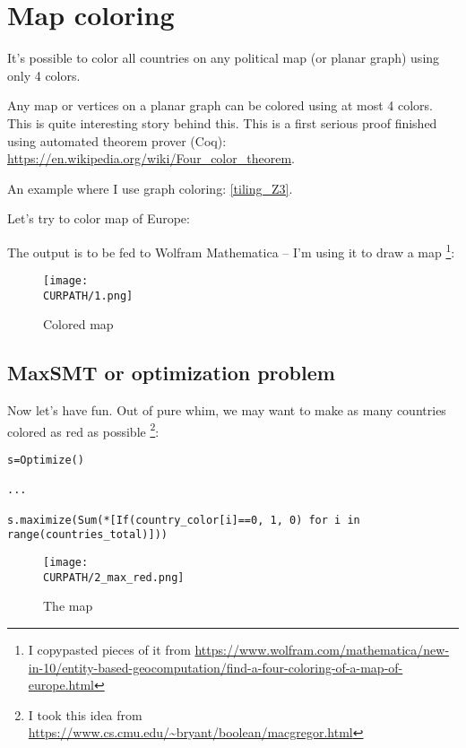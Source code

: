 \section{Map coloring}

\renewcommand{\CURPATH}{color/map}

It's possible to color all countries on any political map (or planar graph) using only 4 colors.

Any map or vertices on a planar graph can be colored using at most 4 colors.
This is quite interesting story behind this.
This is a first serious proof finished using automated theorem prover (Coq):
\url{https://en.wikipedia.org/wiki/Four_color_theorem}.

An example where I use graph coloring: \ref{tiling_Z3}.

Let's try to color map of Europe:



The output is to be fed to Wolfram Mathematica -- I'm using it to draw a map
\footnote{I copypasted pieces of it from \url{https://www.wolfram.com/mathematica/new-in-10/entity-based-geocomputation/find-a-four-coloring-of-a-map-of-europe.html}}:



\begin{figure}[H]
\centering
\texttt{[image: \\CURPATH/1.png]}
\caption{Colored map}
\end{figure}

\subsection{MaxSMT or optimization problem}

Now let's have fun.
Out of pure whim, we may want to make as many countries colored as red as possible
\footnote{I took this idea from \url{https://www.cs.cmu.edu/~bryant/boolean/macgregor.html}}:

\begin{lstlisting}
s=Optimize()

...

s.maximize(Sum(*[If(country_color[i]==0, 1, 0) for i in range(countries_total)]))
\end{lstlisting}

\begin{figure}[H]
\centering
\texttt{[image: \\CURPATH/2\_max\_red.png]}
\caption{The map}
\end{figure}

